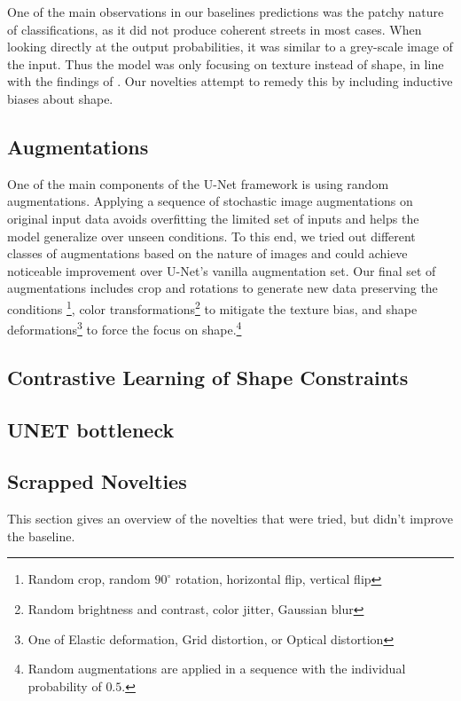 One of the main observations in our baselines predictions was the patchy nature of classifications, as it did not produce coherent streets in most cases. When looking directly at the output probabilities, it was similar to a grey-scale image of the input. Thus the model was only focusing on texture instead of shape, in line with the findings of \cite{baker2018deep}. Our novelties attempt to remedy this by including inductive biases about shape.

\subsection{Augmentations}
One of the main components of the U-Net framework is using random augmentations. Applying a sequence of stochastic image augmentations on original input data avoids overfitting the limited set of inputs and helps the model generalize over unseen conditions. To this end, we tried out different classes of augmentations based on the nature of images and could achieve noticeable improvement over U-Net's vanilla augmentation set. Our final set of augmentations includes crop and rotations to generate new data preserving the conditions \footnote{Random crop,  random $90^{\circ}$ rotation, horizontal flip, vertical flip}, color transformations\footnote{Random brightness and contrast, color jitter, Gaussian blur} to mitigate the texture bias, and shape deformations\footnote{One of Elastic deformation, Grid distortion, or Optical distortion} to force the focus on shape.\footnote{Random augmentations are applied in a sequence with the individual probability of $0.5$.}

\subsection{Contrastive Learning of Shape Constraints}


\subsection{UNET bottleneck}


\subsection{Scrapped Novelties}
    This section gives an overview of the novelties that were tried, but didn't improve the baseline.
    
